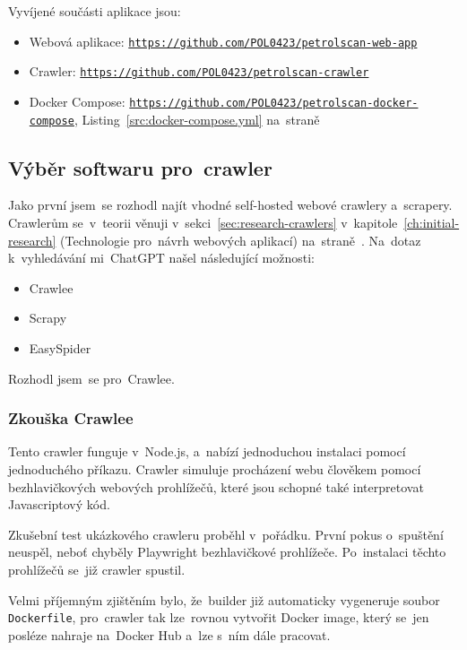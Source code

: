 Vyvíjené součásti aplikace jsou:

\begin{itemize}
    \item Webová aplikace:
        \texttt{\url{https://github.com/POL0423/petrolscan-web-app}}
    \item Crawler:
        \texttt{\url{https://github.com/POL0423/petrolscan-crawler}}
    \item Docker Compose:
        \texttt{\url{https://github.com/POL0423/petrolscan-docker-compose}},
        Listing~\ref{src:docker-compose.yml}
        na~straně~\pageref{src:docker-compose.yml}
\end{itemize}

\subsection{Výběr softwaru pro~crawler}
\label{sec:crawler-solutions}

Jako první jsem~se rozhodl najít vhodné self-hosted webové crawlery
a~scrapery. Crawlerům se~v~teorii věnuji v~sekci~\ref{sec:research-crawlers}
v~kapitole~\ref{ch:initial-research} (Technologie pro~návrh webových aplikací)
na~straně~\pageref{sec:research-crawlers}. Na~dotaz k~vyhledávání
mi~ChatGPT \cite{givNscvAOqB1nMpq} %
našel následující možnosti:

\begin{itemize}
    \item Crawlee
    \item Scrapy
    \item EasySpider
\end{itemize}

Rozhodl jsem~se pro~Crawlee.

\subsubsection{Zkouška Crawlee}
\label{sec:crawlee-trial}

Tento crawler funguje v~Node.js, a~nabízí jednoduchou instalaci pomocí
jednoduchého příkazu. Crawler simuluje procházení webu člověkem pomocí
bezhlavičkových webových prohlížečů, které jsou schopné také interpretovat
Javascriptový kód.

Zkušební test ukázkového crawleru proběhl v~pořádku.
První pokus o~spuštění neuspěl, neboť chyběly Playwright bezhlavičkové
prohlížeče. Po~instalaci těchto prohlížečů se~již crawler spustil.

Velmi příjemným zjištěním bylo, že~builder již automaticky vygeneruje
soubor \texttt{Dockerfile}, pro~crawler tak lze~rovnou vytvořit
Docker image, který se~jen posléze nahraje na~Docker Hub a~lze s~ním
dále pracovat.

